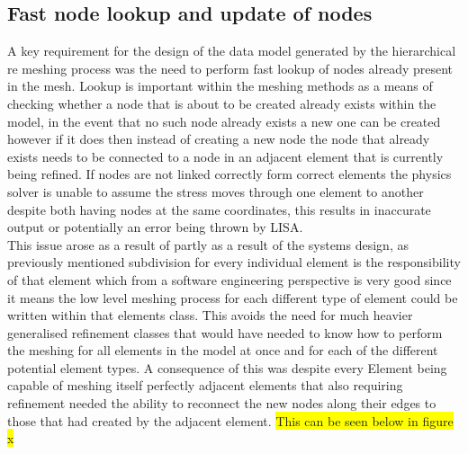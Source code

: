 \subsection{Fast node lookup and update of nodes}
A key requirement for the design of the data model generated by the hierarchical re meshing process was the need to perform fast lookup of nodes already present in the mesh. Lookup is important within the meshing methods as a means of checking whether a node that is about to be created already exists within the model, in the event that no such node already exists a new one can be created however if it does then instead of creating a new node the node that already exists needs to be connected to a node in an adjacent element that is currently being refined. If nodes are not linked correctly form correct elements the physics solver is unable to assume the stress moves through one element to another despite both having nodes at the same coordinates, this results in inaccurate output or potentially an error being thrown by LISA. \\ 

\noindent
This issue arose as a result of partly as a result of the systems design, as previously mentioned subdivision for every individual element is the responsibility of that element which from a software engineering perspective is very good since it means the low level meshing process for each different type of element could be written within that elements class. This avoids the need for much heavier generalised refinement classes that would have needed to know how to perform the meshing for all elements in the model at once and for each of the different potential element types. A consequence of this was despite every Element being capable of meshing itself perfectly adjacent elements that also requiring refinement needed the ability to reconnect the new nodes along their edges to those that had created by the adjacent element. \colorbox{yellow}{This can be seen below in figure x} \\ 


